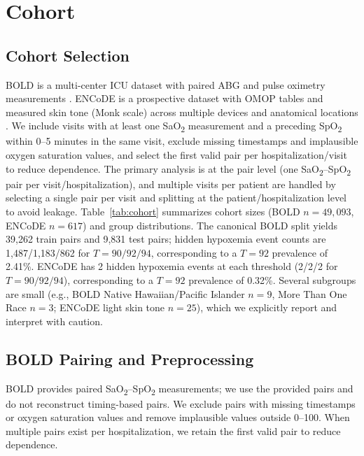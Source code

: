 \documentclass[pmlr]{jmlr}%
\begin{document}
\section{Cohort}

\subsection{Cohort Selection}
BOLD is a multi-center ICU dataset with paired ABG and pulse oximetry measurements \cite{bold2023physionet}. ENCoDE is a prospective dataset with OMOP tables and measured skin tone (Monk scale) across multiple devices and anatomical locations \cite{encode2024}. We include visits with at least one SaO\textsubscript{2} measurement and a preceding SpO\textsubscript{2} within 0--5 minutes in the same visit, exclude missing timestamps and implausible oxygen saturation values, and select the first valid pair per hospitalization/visit to reduce dependence. The primary analysis is at the pair level (one SaO\textsubscript{2}--SpO\textsubscript{2} pair per visit/hospitalization), and multiple visits per patient are handled by selecting a single pair per visit and splitting at the patient/hospitalization level to avoid leakage. Table~\ref{tab:cohort} summarizes cohort sizes (BOLD $n=49{,}093$, ENCoDE $n=617$) and group distributions. The canonical BOLD split yields 39,262 train pairs and 9,831 test pairs; hidden hypoxemia event counts are 1,487/1,183/862 for $T=90/92/94$, corresponding to a $T=92$ prevalence of 2.41\%. ENCoDE has 2 hidden hypoxemia events at each threshold (2/2/2 for $T=90/92/94$), corresponding to a $T=92$ prevalence of 0.32\%. Several subgroups are small (e.g., BOLD Native Hawaiian/Pacific Islander $n=9$, More Than One Race $n=3$; ENCoDE light skin tone $n=25$), which we explicitly report and interpret with caution.

\subsection{BOLD Pairing and Preprocessing}
BOLD provides paired SaO\textsubscript{2}--SpO\textsubscript{2} measurements; we use the provided pairs and do not reconstruct timing-based pairs. We exclude pairs with missing timestamps or oxygen saturation values and remove implausible values outside 0--100. When multiple pairs exist per hospitalization, we retain the first valid pair to reduce dependence.

\begin{table}[htbp]
  \centering
  \small
  \setlength{\tabcolsep}{3pt}
  \caption{Cohort characteristics for BOLD and ENCoDE (one pair per visit; BOLD test split, ENCoDE external cohort).}
  
  \label{tab:cohort}
\end{table}
\end{document}
